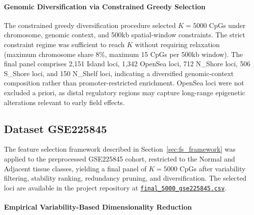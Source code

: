 \paragraph{Genomic Diversification via Constrained Greedy Selection}

The constrained greedy diversification procedure selected 
$K=5000$ CpGs under chromosome, genomic context, and 
500kb spatial-window constraints. The strict 
constraint regime was sufficient to reach $K$ without requiring 
relaxation (maximum chromosome share 8\%, maximum 15 CpGs 
per 500kb window).
The final panel comprises 2{,}151 Island loci, 1{,}342 OpenSea loci, 
712 N\_Shore loci, 506 S\_Shore loci, and 150 N\_Shelf loci, 
indicating a diversified genomic-context composition rather than 
promoter-restricted enrichment. OpenSea loci were not excluded a priori, as distal regulatory 
regions may capture long-range epigenetic alterations relevant 
to early field effects.

\subsection{Dataset GSE225845}
\label{subsec:fs_intra_gse225845}
The feature selection framework described in Section~\ref{sec:fs_framework} 
was applied to the preprocessed GSE225845 cohort, restricted to the 
Normal and Adjacent tissue classes, yielding a final panel of 
$K=5000$ CpGs after variability filtering, stability ranking, 
redundancy pruning, and diversification. The selected loci are 
available in the project repository at 
\href{https://github.com/elisabettaroviera/THESIS/blob/main/05%20-%20CpG%20list/Final%205000%20CpGs%20per%20Dataset/final_5000_gse225845.csv}
{\texttt{final\_5000\_gse225845.csv}}.

\paragraph{Empirical Variability-Based Dimensionality Reduction}

